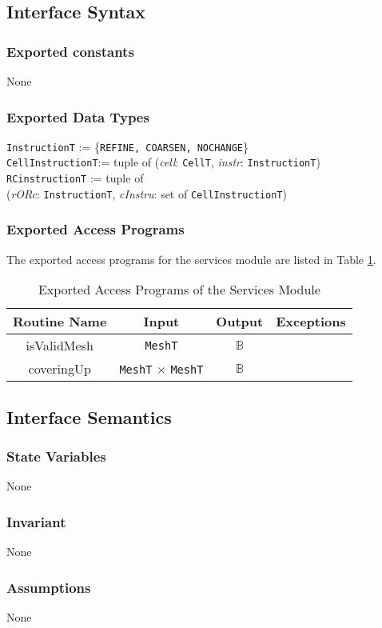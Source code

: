 \documentclass[12pt,titlepage]{article}
\begin{document}
\subsection{Interface Syntax}
\subsubsection{Exported constants} None
\subsubsection{Exported Data Types} 
{\tt InstructionT} := \{{\tt REFINE, COARSEN, NOCHANGE}\}\\
{\tt CellInstructionT}:= tuple of ({\it cell}: {\tt CellT}, {\it instr}: {\tt InstructionT})\\
{\tt RCinstructionT} := tuple of \\({\it rORc}: {\tt InstructionT}, {\it cInstru}: set of {\tt CellInstructionT}) 
\subsubsection{Exported Access Programs}
The exported access programs for the services module are listed in Table \ref{AmisSerEAP}.
\begin{table}[htbp]
\centering
\begin{tabular}{|c|c|c|c|}
\hline
Routine Name & Input & Output & Exceptions \\ 
\hline
isValidMesh & {\tt MeshT} & $\mathbb{B}$ & \\
\hline
coveringUp & {\tt MeshT} $\times$ {\tt MeshT}& $\mathbb{B}$ & \\
\hline
\end{tabular}
\caption{Exported Access Programs of the Services Module}
\label{AmisSerEAP} 
\end{table}

\subsection{Interface Semantics}
\subsubsection{State Variables}None
\subsubsection{Invariant} None
\subsubsection{Assumptions} None
\end{document}
